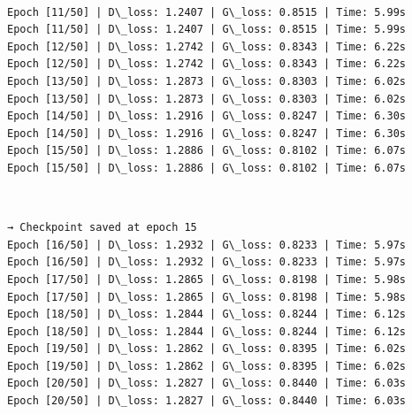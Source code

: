 \documentclass[11pt]{article}
\begin{document}
    \begin{center}
    \end{center}
    { \hspace*{\fill} \\}
    
    \begin{Verbatim}[commandchars=\\\{\}]
Epoch [11/50] | D\_loss: 1.2407 | G\_loss: 0.8515 | Time: 5.99s
Epoch [11/50] | D\_loss: 1.2407 | G\_loss: 0.8515 | Time: 5.99s
Epoch [12/50] | D\_loss: 1.2742 | G\_loss: 0.8343 | Time: 6.22s
Epoch [12/50] | D\_loss: 1.2742 | G\_loss: 0.8343 | Time: 6.22s
Epoch [13/50] | D\_loss: 1.2873 | G\_loss: 0.8303 | Time: 6.02s
Epoch [13/50] | D\_loss: 1.2873 | G\_loss: 0.8303 | Time: 6.02s
Epoch [14/50] | D\_loss: 1.2916 | G\_loss: 0.8247 | Time: 6.30s
Epoch [14/50] | D\_loss: 1.2916 | G\_loss: 0.8247 | Time: 6.30s
Epoch [15/50] | D\_loss: 1.2886 | G\_loss: 0.8102 | Time: 6.07s
Epoch [15/50] | D\_loss: 1.2886 | G\_loss: 0.8102 | Time: 6.07s
    \end{Verbatim}

    \begin{center}
    \end{center}
    { \hspace*{\fill} \\}
    
    \begin{Verbatim}[commandchars=\\\{\}]
  → Checkpoint saved at epoch 15
Epoch [16/50] | D\_loss: 1.2932 | G\_loss: 0.8233 | Time: 5.97s
Epoch [16/50] | D\_loss: 1.2932 | G\_loss: 0.8233 | Time: 5.97s
Epoch [17/50] | D\_loss: 1.2865 | G\_loss: 0.8198 | Time: 5.98s
Epoch [17/50] | D\_loss: 1.2865 | G\_loss: 0.8198 | Time: 5.98s
Epoch [18/50] | D\_loss: 1.2844 | G\_loss: 0.8244 | Time: 6.12s
Epoch [18/50] | D\_loss: 1.2844 | G\_loss: 0.8244 | Time: 6.12s
Epoch [19/50] | D\_loss: 1.2862 | G\_loss: 0.8395 | Time: 6.02s
Epoch [19/50] | D\_loss: 1.2862 | G\_loss: 0.8395 | Time: 6.02s
Epoch [20/50] | D\_loss: 1.2827 | G\_loss: 0.8440 | Time: 6.03s
Epoch [20/50] | D\_loss: 1.2827 | G\_loss: 0.8440 | Time: 6.03s
    \end{Verbatim}

    \begin{center}
    \end{center}
    { \hspace*{\fill} \\}
    
\end{document}
